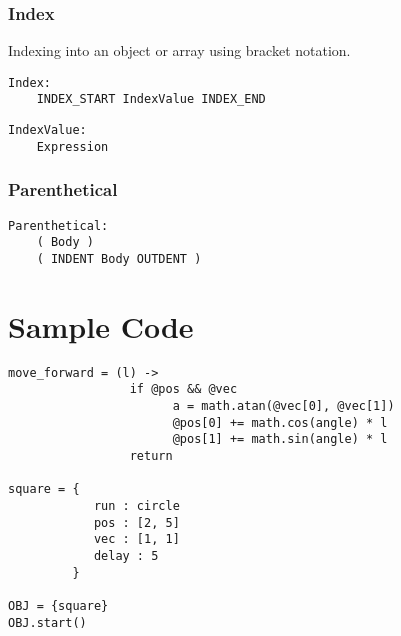 \documentclass[10pt]{report}
\begin{document}
\subsection{Index}
Indexing into an object or array using bracket notation.
\begin{verbatim}
Index:
    INDEX_START IndexValue INDEX_END
\end{verbatim}

\begin{verbatim}
IndexValue:
    Expression
\end{verbatim}


\subsection{Parenthetical}

\begin{verbatim}
Parenthetical:
    ( Body )
    ( INDENT Body OUTDENT )
\end{verbatim}



\chapter{Sample Code}
\label{chap:sample}

\begin{verbatim}
move_forward = (l) ->
                 if @pos && @vec
                       a = math.atan(@vec[0], @vec[1])
                       @pos[0] += math.cos(angle) * l
                       @pos[1] += math.sin(angle) * l
                 return

square = {
            run : circle
            pos : [2, 5]
            vec : [1, 1]
            delay : 5
         }

OBJ = {square}
OBJ.start()

\end{verbatim}
\end{document}
